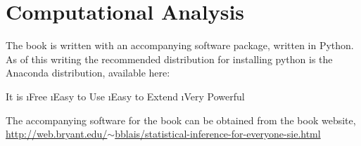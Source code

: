 \chapter{Computational Analysis}\label{app:computational}

The book is written with an accompanying software package, written in Python.  As of this writing the recommended distribution for installing python is the Anaconda distribution, available here:


It is
\bi
\i Free
\i Easy to Use
\i Easy to Extend
\i Very Powerful
\ei

The accompanying software for the book can be obtained from the book website, 
\href{http://web.bryant.edu/~bblais/statistical-inference-for-everyone-sie.html}{http://web.bryant.edu/$\sim$bblais/statistical-inference-for-everyone-sie.html}